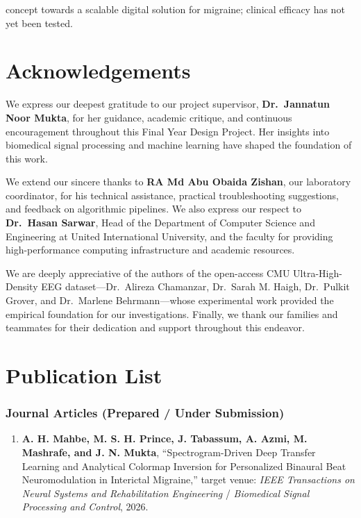 \documentclass[12pt, a4paper]{report}
\begin{document}
concept towards a scalable digital solution for migraine; clinical efficacy has not yet been tested.
\newpage

\chapter*{Acknowledgements}
We express our deepest gratitude to our project supervisor, \textbf{Dr.~Jannatun Noor Mukta}, for her guidance, academic critique, and continuous encouragement throughout this Final Year Design Project. Her insights into biomedical signal processing and machine learning have shaped the foundation of this work.

We extend our sincere thanks to \textbf{RA Md Abu Obaida Zishan}, our laboratory coordinator, for his technical assistance, practical troubleshooting suggestions, and feedback on algorithmic pipelines. We also express our respect to \textbf{Dr.~Hasan Sarwar}, Head of the Department of Computer Science and Engineering at United International University, and the faculty for providing high-performance computing infrastructure and academic resources.

We are deeply appreciative of the authors of the open-access CMU Ultra-High-Density EEG dataset---Dr.~Alireza Chamanzar, Dr.~Sarah M. Haigh, Dr.~Pulkit Grover, and Dr.~Marlene Behrmann---whose experimental work provided the empirical foundation for our investigations. Finally, we thank our families and teammates for their dedication and support throughout this endeavor.

\newpage

\chapter*{Publication List}

\subsection*{Journal Articles (Prepared / Under Submission)}
\begin{enumerate}
    \item \textbf{A. H. Mahbe, M. S. H. Prince, J. Tabassum, A. Azmi, M. Mashrafe, and J. N. Mukta}, ``Spectrogram-Driven Deep Transfer Learning and Analytical Colormap Inversion for Personalized Binaural Beat Neuromodulation in Interictal Migraine,'' target venue: \textit{IEEE Transactions on Neural Systems and Rehabilitation Engineering} / \textit{Biomedical Signal Processing and Control}, 2026.
\end{enumerate}
\end{document}
